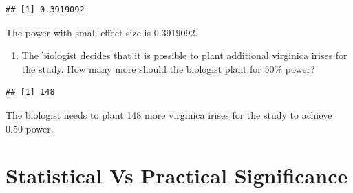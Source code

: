 \documentclass[
]{book}
\newenvironment{Shaded}{\begin{snugshade}}{\end{snugshade}}
\newcommand{\AttributeTok}[1]{\textcolor[rgb]{0.13,0.29,0.53}{#1}}
\newcommand{\DecValTok}[1]{\textcolor[rgb]{0.00,0.00,0.81}{#1}}
\newcommand{\DocumentationTok}[1]{\textcolor[rgb]{0.56,0.35,0.01}{\textbf{\textit{#1}}}}
\newcommand{\FloatTok}[1]{\textcolor[rgb]{0.00,0.00,0.81}{#1}}
\newcommand{\FunctionTok}[1]{\textcolor[rgb]{0.13,0.29,0.53}{\textbf{#1}}}
\newcommand{\NormalTok}[1]{#1}
\newcommand{\OtherTok}[1]{\textcolor[rgb]{0.56,0.35,0.01}{#1}}
\newcommand{\SpecialCharTok}[1]{\textcolor[rgb]{0.81,0.36,0.00}{\textbf{#1}}}
\newcommand{\StringTok}[1]{\textcolor[rgb]{0.31,0.60,0.02}{#1}}
\providecommand{\tightlist}{%
  \setlength{\itemsep}{0pt}\setlength{\parskip}{0pt}}
\theoremstyle{definition}
\theoremstyle{definition}
\theoremstyle{definition}
\theoremstyle{definition}
\theoremstyle{remark}
\begin{document}
\begin{Shaded}
\end{Shaded}

\begin{verbatim}
## [1] 0.3919092
\end{verbatim}

The power with small effect size is 0.3919092.

\begin{enumerate}
\def\labelenumi{\arabic{enumi}.}
\setcounter{enumi}{4}
\tightlist
\item
  The biologist decides that it is possible to plant additional virginica irises for the study. How many more should the biologist plant for 50\% power?
\end{enumerate}

\begin{Shaded}
\end{Shaded}

\begin{verbatim}
## [1] 148
\end{verbatim}

The biologist needs to plant 148 more virginica irises for the study to achieve 0.50 power.

\hypertarget{statistical-vs-practical-significance}{%
\section{Statistical Vs Practical Significance}\label{statistical-vs-practical-significance}}
\end{document}
